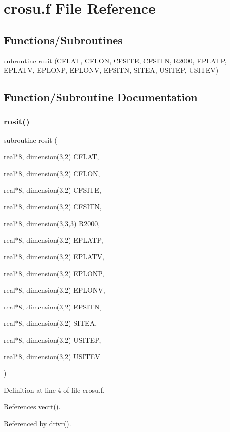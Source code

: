 \hypertarget{crosu_8f}{}\section{crosu.\+f File Reference}
\label{crosu_8f}
\subsection*{Functions/\+Subroutines}
\begin{DoxyCompactItemize}
\item 
subroutine \hyperlink{crosu_8f_a0b3bc24844721f9746ca9435f3c3b679}{rosit} (C\+F\+L\+AT, C\+F\+L\+ON, C\+F\+S\+I\+TE, C\+F\+S\+I\+TN, R2000, E\+P\+L\+A\+TP, E\+P\+L\+A\+TV, E\+P\+L\+O\+NP, E\+P\+L\+O\+NV, E\+P\+S\+I\+TN, S\+I\+T\+EA, U\+S\+I\+T\+EP, U\+S\+I\+T\+EV)
\end{DoxyCompactItemize}


\subsection{Function/\+Subroutine Documentation}
\mbox{\label{crosu_8f_a0b3bc24844721f9746ca9435f3c3b679}} 
\subsubsection{\texorpdfstring{rosit()}{rosit()}}
{\footnotesize\ttfamily subroutine rosit (\begin{DoxyParamCaption}\item[{real$\ast$8, dimension(3,2)}]{C\+F\+L\+AT,  }\item[{real$\ast$8, dimension(3,2)}]{C\+F\+L\+ON,  }\item[{real$\ast$8, dimension(3,2)}]{C\+F\+S\+I\+TE,  }\item[{real$\ast$8, dimension(3,2)}]{C\+F\+S\+I\+TN,  }\item[{real$\ast$8, dimension(3,3,3)}]{R2000,  }\item[{real$\ast$8, dimension(3,2)}]{E\+P\+L\+A\+TP,  }\item[{real$\ast$8, dimension(3,2)}]{E\+P\+L\+A\+TV,  }\item[{real$\ast$8, dimension(3,2)}]{E\+P\+L\+O\+NP,  }\item[{real$\ast$8, dimension(3,2)}]{E\+P\+L\+O\+NV,  }\item[{real$\ast$8, dimension(3,2)}]{E\+P\+S\+I\+TN,  }\item[{real$\ast$8, dimension(3,2)}]{S\+I\+T\+EA,  }\item[{real$\ast$8, dimension(3,2)}]{U\+S\+I\+T\+EP,  }\item[{real$\ast$8, dimension(3,2)}]{U\+S\+I\+T\+EV }\end{DoxyParamCaption})}



Definition at line 4 of file crosu.\+f.



References vecrt().



Referenced by drivr().


